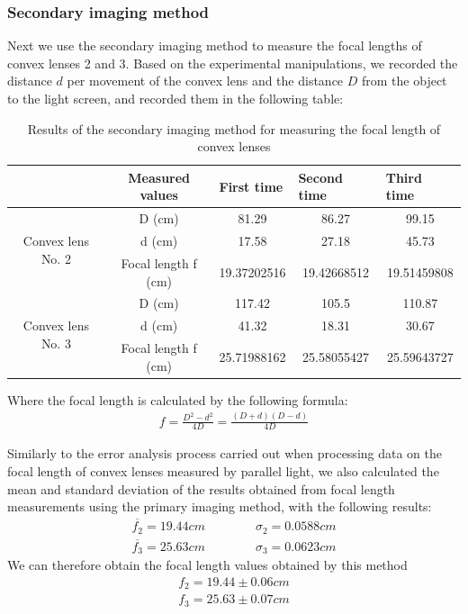 \documentclass[UTF8]{article}
\begin{document}
    \subsubsection{Secondary imaging method}
    Next we use the secondary imaging method to measure the focal lengths of convex lenses 2 and 3. Based on the experimental manipulations, we recorded the distance $d$ per movement of the convex lens and the distance $D$ from the object to the light screen, and recorded them in the following table:
    
    
  \begin{table}[htbp]
    \centering
    \caption{Results of the secondary imaging method for measuring the focal length of convex lenses}
      \begin{tabular}{ccccc}
       \toprule[2pt]
            & Measured values & \multicolumn{1}{l}{First time} & \multicolumn{1}{l}{Second time} & \multicolumn{1}{l}{Third time} \\
            \midrule
      \multirow{3}[4]{*}{Convex lens No. 2} & D (cm) & 81.29 & 86.27 & 99.15 \\
      \cmidrule{2-5}      & d (cm) & 17.58 & 27.18 & 45.73 \\
       \cmidrule{2-5}     & Focal length f (cm) & 19.37202516 & 19.42668512 & 19.51459808 \\
            \midrule
     \multirow{3}[4]{*}{Convex lens No. 3} & D (cm) & 117.42 & 105.5 & 110.87 \\
      \cmidrule{2-5}      & d (cm) & 41.32 & 18.31 & 30.67 \\
      \cmidrule{2-5}      & Focal length f (cm) & 25.71988162 & 25.58055427 & 25.59643727 \\
      \bottomrule[2pt]
      \end{tabular}%
    \label{tab:addlabel}%
  \end{table}%
  
    Where the focal length is calculated by the following formula:
    \begin{eqnarray}
    	f  =  \frac{D^2-d^2}{4D}  =  \frac{(D+d)(D-d)}{4D}  
    	\end{eqnarray}
        
    Similarly to the error analysis process carried out when processing data on the focal length of convex lenses measured by parallel light, we also calculated the mean and standard deviation of the results obtained from focal length measurements using the primary imaging method, with the following results:
    \begin{align*}
     \overline{f_2}  =  19.44cm \qquad \qquad \sigma _2  = 0.0588cm\\
     \overline{f_3}  =  25.63cm \qquad \qquad \sigma _3  = 0.0623cm
    \end{align*}
    We can therefore obtain the focal length values obtained by this method
    \begin{align*}
    f_2 = 19.44\pm 0.06cm\\
    f_3 = 25.63  \pm 0.07cm
    \end{align*}
    
\end{document}
